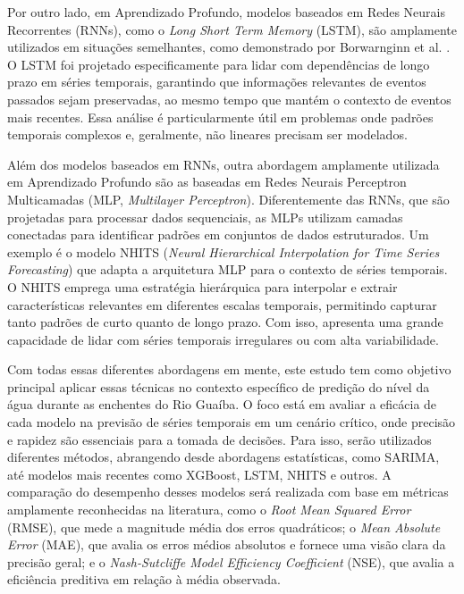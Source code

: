 Por outro lado, em Aprendizado Profundo, modelos baseados em Redes Neurais Recorrentes (RNNs), como o \textit{Long Short
Term Memory} (LSTM), são amplamente utilizados em situações semelhantes, como demonstrado por Borwarnginn et al.
\cite{borwarnginn}. O LSTM foi projetado especificamente para lidar com dependências de longo prazo em séries temporais,
garantindo que informações relevantes de eventos passados sejam preservadas, ao mesmo tempo que mantém o contexto de
eventos mais recentes. Essa análise é particularmente útil em problemas onde padrões temporais complexos e, geralmente,
não lineares precisam ser modelados.

Além dos modelos baseados em RNNs, outra abordagem amplamente utilizada em Aprendizado Profundo são as baseadas em Redes
Neurais Perceptron Multicamadas (MLP, \textit{Multilayer Perceptron}). Diferentemente das RNNs, que são projetadas para
processar dados sequenciais, as MLPs utilizam camadas conectadas para identificar padrões em conjuntos de dados
estruturados. Um exemplo é o modelo NHITS (\textit{Neural Hierarchical Interpolation for Time Series Forecasting})
\cite{challu} que adapta a arquitetura MLP para o contexto de séries temporais. O NHITS emprega uma estratégia
hierárquica para interpolar e extrair características relevantes em diferentes escalas temporais, permitindo capturar
tanto padrões de curto quanto de longo prazo. Com isso, apresenta uma grande capacidade de lidar com séries temporais
irregulares ou com alta variabilidade.

Com todas essas diferentes abordagens em mente, este estudo tem como objetivo principal aplicar essas técnicas no
contexto específico de predição do nível da água durante as enchentes do Rio Guaíba. O foco está em avaliar a eficácia
de cada modelo na previsão de séries temporais em um cenário crítico, onde precisão e rapidez são essenciais para a
tomada de decisões. Para isso, serão utilizados diferentes métodos, abrangendo desde abordagens estatísticas, como
SARIMA, até modelos mais recentes como XGBoost, LSTM, NHITS e outros. A comparação do desempenho desses modelos será
realizada com base em métricas amplamente reconhecidas na literatura, como o \textit{Root Mean Squared Error} (RMSE),
que mede a magnitude média dos erros quadráticos; o \textit{Mean Absolute Error} (MAE), que avalia os erros médios
absolutos e fornece uma visão clara da precisão geral; e o \textit{Nash-Sutcliffe Model Efficiency Coefficient} (NSE),
que avalia a eficiência preditiva em relação à média observada. 


